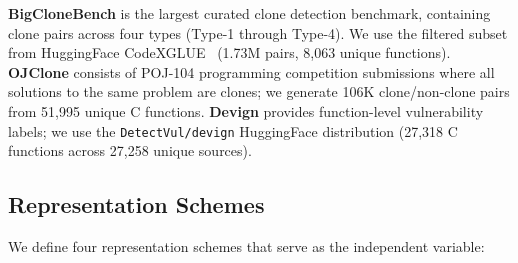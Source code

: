 \documentclass[pdflatex,sn-mathphys,Numbered]{sn-jnl}
\begin{document}
\textbf{BigCloneBench} is the largest curated clone detection benchmark, containing clone pairs across four types (Type-1 through Type-4). We use the filtered subset from HuggingFace CodeXGLUE~\citep{lu2021codexglue} (1.73M pairs, 8,063 unique functions). \textbf{OJClone} consists of POJ-104 programming competition submissions where all solutions to the same problem are clones; we generate 106K clone/non-clone pairs from 51,995 unique C functions. \textbf{Devign} provides function-level vulnerability labels; we use the \texttt{DetectVul/devign} HuggingFace distribution (27,318 C functions across 27,258 unique sources).

\subsection{Representation Schemes}

We define four representation schemes that serve as the independent variable:
\end{document}

